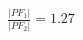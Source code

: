 \documentclass[preview]{standalone}
\begin{document}
\begin{align*}
\frac{|PF_1|}{|PF_2|} = 1.27
\end{align*}
\end{document}
